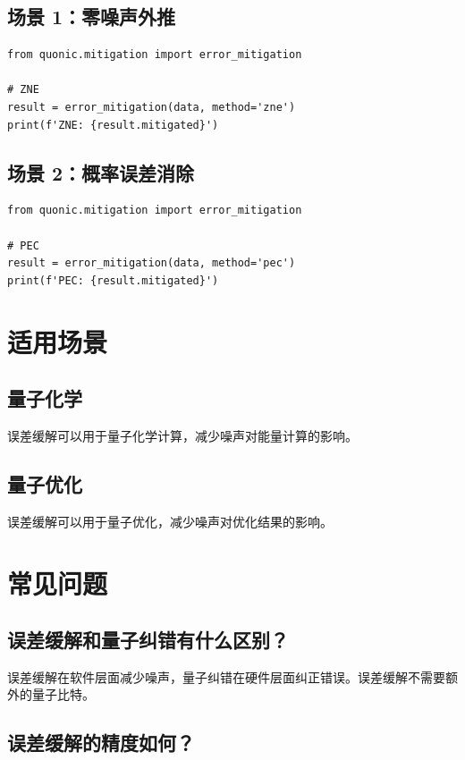 \documentclass[12pt,a4paper]{article}
\begin{document}
\subsection{场景 1：零噪声外推}

\begin{verbatim}
from quonic.mitigation import error_mitigation

# ZNE
result = error_mitigation(data, method='zne')
print(f'ZNE: {result.mitigated}')
\end{verbatim}

\subsection{场景 2：概率误差消除}

\begin{verbatim}
from quonic.mitigation import error_mitigation

# PEC
result = error_mitigation(data, method='pec')
print(f'PEC: {result.mitigated}')
\end{verbatim}

\section{适用场景}

\subsection{量子化学}

误差缓解可以用于量子化学计算，减少噪声对能量计算的影响。

\subsection{量子优化}

误差缓解可以用于量子优化，减少噪声对优化结果的影响。

\section{常见问题}

\subsection{误差缓解和量子纠错有什么区别？}

误差缓解在软件层面减少噪声，量子纠错在硬件层面纠正错误。误差缓解不需要额外的量子比特。

\subsection{误差缓解的精度如何？}
\end{document}

